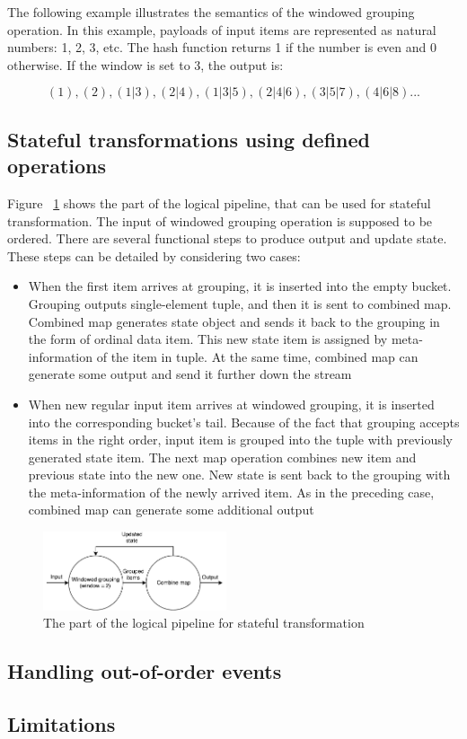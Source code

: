 The following example illustrates the semantics of the windowed grouping operation. In this example, payloads of input items are represented as natural numbers: 1, 2, 3, etc. The hash function returns 1 if the number is even and 0 otherwise. If the window is set to 3, the output is:

\[(1), (2), (1|3), (2|4), (1|3|5), (2|4|6), (3|5|7), (4|6|8)...\]

\subsection{Stateful transformations using defined operations}
Figure ~\ref{stateful-schema} shows the part of the logical pipeline, that can be used for stateful transformation. The input of windowed grouping operation is supposed to be ordered. There are several functional steps to produce output and update state. These steps can be detailed by considering two cases:

\begin{itemize}
    \item When the first item arrives at grouping, it is inserted into the empty bucket. Grouping outputs single-element tuple, and then it is sent to combined map. Combined map generates state object and sends it back to the grouping in the form of ordinal data item. This new state item is assigned by meta-information of the item in tuple. At the same time, combined map can generate some output and send it further down the stream
    \item When new regular input item arrives at windowed grouping, it is inserted into the corresponding bucket's tail. Because of the fact that grouping accepts items in the right order, input item is grouped into the tuple with previously generated state item. The next map operation combines new item and previous state into the new one. New state is sent back to the grouping with the meta-information of the newly arrived item. As in the preceding case, combined map can generate some additional output
\end{itemize}

\begin{figure}[htbp]
  \centering
  \includegraphics[width=0.48\textwidth]{pics/stateful-schema}
  \caption{The part of the logical pipeline for stateful transformation}
  \label {stateful-schema}
\end{figure}

\subsection{Handling out-of-order events}

\subsection{Limitations}




